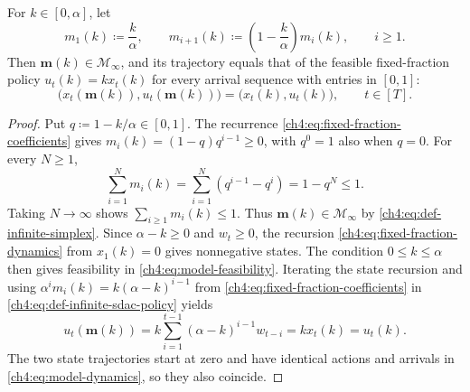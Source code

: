 \begin{Thm:Corollary}
\label{ch4:cor:fraction-as-sdac}
For $k\in[0,\alpha]$, let
\begin{equation}
\label{ch4:eq:fixed-fraction-coefficients}
m_1(k)\coloneqq\frac{k}{\alpha},\qquad
m_{i+1}(k)\coloneqq\left(1-\frac{k}{\alpha}\right)m_i(k),\qquad i\ge1.
\end{equation}
Then $\mathbf m(k)\in\mathcal M_\infty$, and its trajectory
equals that of the feasible fixed-fraction policy $u_t(k)=kx_t(k)$ for every
arrival sequence with entries in $[0,1]$:
\[
\bigl(x_t(\mathbf m(k)),u_t(\mathbf m(k))\bigr)
=\bigl(x_t(k),u_t(k)\bigr),\qquad t\in[T].
\]
\end{Thm:Corollary}
\begin{proof}
Put $q\coloneqq1-k/\alpha\in[0,1]$. The recurrence
\eqref{ch4:eq:fixed-fraction-coefficients} gives
$m_i(k)=(1-q)q^{i-1}\ge0$, with $q^0=1$ also when $q=0$.
For every $N\ge1$,
\[
\sum_{i=1}^N m_i(k)
=\sum_{i=1}^N(q^{i-1}-q^i)
=1-q^N\le1.
\]
Taking $N\to\infty$ shows $\sum_{i\ge1}m_i(k)\le1$.
Thus $\mathbf m(k)\in\mathcal M_\infty$ by
\eqref{ch4:eq:def-infinite-simplex}.
Since $\alpha-k\ge0$ and $w_t\ge0$, the recursion
\eqref{ch4:eq:fixed-fraction-dynamics} from $x_1(k)=0$ gives nonnegative states.
The condition $0\le k\le\alpha$ then gives feasibility in
\eqref{ch4:eq:model-feasibility}. Iterating the state recursion and using
$\alpha^i m_i(k)=k(\alpha-k)^{i-1}$ from
\eqref{ch4:eq:fixed-fraction-coefficients} in
\eqref{ch4:eq:def-infinite-sdac-policy} yields
\[
u_t(\mathbf m(k))
=k\sum_{i=1}^{t-1}(\alpha-k)^{i-1}w_{t-i}
=kx_t(k)=u_t(k).
\]
The two state trajectories start at zero and have identical actions and
arrivals in \eqref{ch4:eq:model-dynamics}, so they also coincide.
\end{proof}

